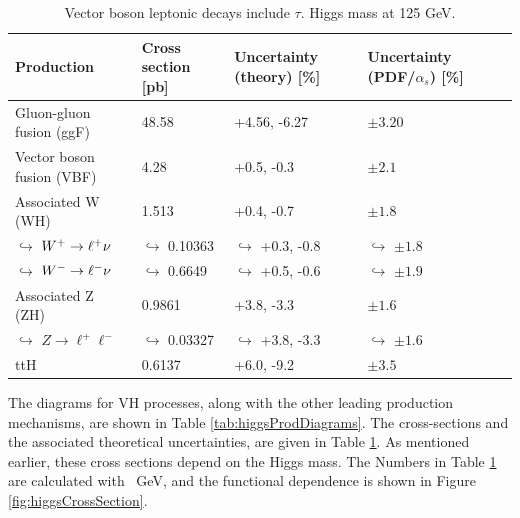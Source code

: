 \begin{table}[htp]
\begin{center}
{\footnotesize
\begin{tabular}{l | l | l l l}
\toprule
Production & Cross section [pb] & Uncertainty (theory) [\%] & Uncertainty (PDF/$\alpha_s$) [\%] \\
\midrule
Gluon-gluon fusion (ggF)  & 48.58       & +4.56, -6.27 & $\pm3.20$  \\
Vector boson fusion (VBF) &  4.28       & +0.5, -0.3 & $\pm2.1$  \\
Associated W (WH)         & 1.513       & +0.4, -0.7 & $\pm1.8$  \\
$\hookrightarrow$  $W^+\to\ell^+\nu$    &$\hookrightarrow$ 0.10363 &$\hookrightarrow$ +0.3, -0.8 &$\hookrightarrow$ $\pm1.8$  \\
$\hookrightarrow$  $W^-\to\ell^-\nu$    &$\hookrightarrow$ 0.6649  &$\hookrightarrow$ +0.5, -0.6 &$\hookrightarrow$ $\pm1.9$  \\
Associated Z (ZH)         & 0.9861      & +3.8, -3.3 & $\pm1.6$  \\
$\hookrightarrow$  $Z\to\ell^+\ell^-$   &$\hookrightarrow$ 0.03327 &$\hookrightarrow$ +3.8, -3.3 &$\hookrightarrow$ $\pm1.6$  \\
ttH                       &  0.6137     & +6.0, -9.2 & $\pm3.5$  \\
\bottomrule
\end{tabular}
}
\caption{Vector boson leptonic decays include $\tau$. Higgs mass at 125 GeV.\cite{higgsCross}}
\label{tab:higgsCrossSec}
\end{center}
\end{table}

The diagrams for VH processes, along with the other leading production mechanisms, are shown in Table \ref{tab:higgsProdDiagrams}.
The cross-sections and the associated theoretical uncertainties, are given in Table \ref{tab:higgsCrossSec}.
As mentioned earlier, these cross sections depend on the Higgs mass. The Numbers in Table \ref{tab:higgsCrossSec} are calculated with ~GeV, and the functional dependence is shown in Figure \ref{fig:higgsCrossSection}.

